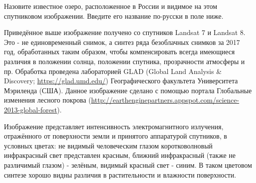 
Назовите известное озеро, расположенное в России и видимое на этом спутниковом изображении. Введите его название по-русски в поле ниже. 


Приведённое выше изображение получено со спутников Landsat 7 и Landsat 8. Это - не единовременный снимок, 
а синтез ряда безоблачных снимков за 2017 год, обработанных таким образом, чтобы компенсировать всегда 
имеющиеся различия в положении солнца, положении спутника, прозрачности атмосферы и пр. 
Обработка проведена лабораторией GLAD (Global Land Analysis \& Discovery; \url{https://glad.umd.edu/}) Географического факультета Университета Мэриленда (США). 
Данное изображение сделано с помощью портала Глобальные изменения лесного покрова (\url{http://earthenginepartners.appspot.com/science-2013-global-forest}).

Изображение представляет интенсивность электромагнитного излучения, отражённого от поверхности земли и принятого аппаратурой спутников, в условных цветах: не видимый человеческим глазом коротковолновый инфракрасный свет представлен красным, ближний инфракрасный (также не различимый глазом) - зелёным, видимый красный свет - синим. В таком цветовом синтезе хорошо видны различия в растительности и влажности поверхности.

